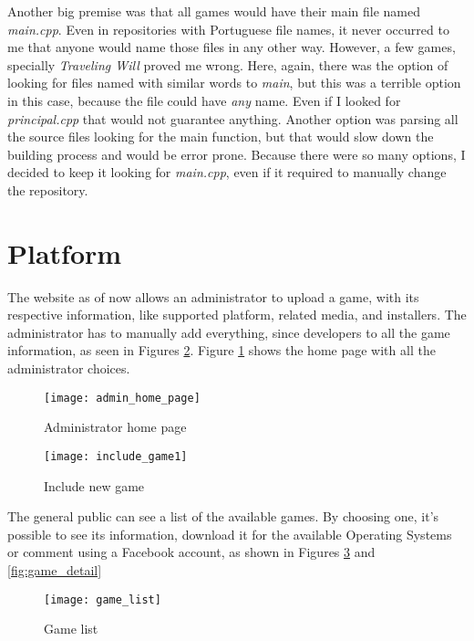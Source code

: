 Another big premise was that all games would have their main file named \textit{main.cpp}. Even in repositories with Portuguese file names, it never occurred to me that anyone would name those files in any other way. However, a few games, specially \textit{Traveling Will} proved me wrong. Here, again, there was the option of looking for files named with similar words to \textit{main}, but this was a terrible option in this case, because the file could have \textit{any} name. Even if I looked for \textit{principal.cpp} that would not guarantee anything. Another option was parsing all the source files looking for the main function, but that would slow down the building process and would be error prone. Because there were so many options, I decided to keep it looking for \textit{main.cpp}, even if it required to manually change the repository.

\section{Platform}
\label{sec:platform}

The website as of now allows an administrator to upload a game, with its respective information, like supported platform, related media, and installers.
The administrator has to manually add everything, since developers to all the game information, as seen in Figures \ref{fig:include_game1}. Figure \ref{fig:admin_home} shows the home page with all the administrator choices.

\begin{figure}[h!]
\centering
\texttt{[image: admin\_home\_page]}
\caption{Administrator home page}
\label{fig:admin_home}
\end{figure}

\begin{figure}[h!]
\centering
\texttt{[image: include\_game1]}
\caption{Include new game}
\label{fig:include_game1}
\end{figure}

The general public can see a list of the available games. By choosing one, it's possible to see its information, download it for the available Operating Systems or comment using a Facebook account, as shown in Figures \ref{fig:game_list} and \ref{fig:game_detail}

\begin{figure}[h!]
\centering
\texttt{[image: game\_list]}
\caption{Game list}
\label{fig:game_list}
\end{figure}


